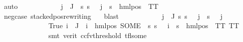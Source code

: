 \begin{isabellebody}
\ auto\isanewline
\ \ \ \ \ \ \ \ \ \ \isamarkupfalse%
\ {\isachardoublequoteopen}{\isasymforall}j\ {\isasymin}\ J{\isachardot}{\kern0pt}\ {\isasymexists}{\isasymalpha}{\isachardot}{\kern0pt}\ {\isacharparenleft}{\kern0pt}{\isasymforall}s{\isachardot}{\kern0pt}\ {\isacharparenleft}{\kern0pt}s\ {\isasymTurnstile}\ {\isasymPhi}\ j{\isacharparenright}{\kern0pt}\ {\isasymlongleftrightarrow}\ {\isacharparenleft}{\kern0pt}s\ {\isasymTurnstile}\ {\isacharparenleft}{\kern0pt}hml{\isacharunderscore}{\kern0pt}pos\ {\isasymalpha}\ TT{\isacharparenright}{\kern0pt}{\isacharparenright}{\kern0pt}{\isacharparenright}{\kern0pt}{\isachardoublequoteclose}\isanewline
\ \ \ \ \ \ \ \ \ \ \ \ \isamarkupfalse%
\ neg{\isacharunderscore}{\kern0pt}case\ stacked{\isacharunderscore}{\kern0pt}pos{\isacharunderscore}{\kern0pt}rewriting\ {\isachardoublequoteopen}{}{\isachardoublequoteclose}\ \isamarkupfalse%
\ blast\isanewline
\ \ \ \ \ \ \ \ \ \ \isamarkupfalse%
\ {\isachardoublequoteopen}{\isasymforall}j\ {\isasymin}\ J{\isachardot}{\kern0pt}\ {\isacharparenleft}{\kern0pt}{\isasymforall}s{\isachardot}{\kern0pt}\ {\isacharparenleft}{\kern0pt}s\ {\isasymTurnstile}\ {\isasymPhi}\ j{\isacharparenright}{\kern0pt}\ {\isasymlongleftrightarrow}\ {\isacharparenleft}{\kern0pt}s\ {\isasymTurnstile}\ {\isasymPsi}\ j{\isacharparenright}{\kern0pt}{\isacharparenright}{\kern0pt}{\isachardoublequoteclose}\isanewline
\ \ \ \ \ \ \ \ \ \ \ \ \isamarkupfalse%
\ True\ {\isacartoucheopen}{\isasymforall}i\ {\isasymin}\ J{\isachardot}{\kern0pt}\ {\isasymPsi}\ i\ {\isacharequal}{\kern0pt}\ {\isacharparenleft}{\kern0pt}hml{\isacharunderscore}{\kern0pt}pos\ {\isacharparenleft}{\kern0pt}SOME\ {\isasymalpha}{\isachardot}{\kern0pt}\ {\isacharparenleft}{\kern0pt}{\isasymforall}s{\isachardot}{\kern0pt}\ {\isacharparenleft}{\kern0pt}s\ {\isasymTurnstile}\ {\isasymPhi}\ i{\isacharparenright}{\kern0pt}\ {\isasymlongleftrightarrow}\ {\isacharparenleft}{\kern0pt}s\ {\isasymTurnstile}\ {\isacharparenleft}{\kern0pt}hml{\isacharunderscore}{\kern0pt}pos\ {\isasymalpha}\ TT{\isacharparenright}{\kern0pt}{\isacharparenright}{\kern0pt}{\isacharparenright}{\kern0pt}{\isacharparenright}{\kern0pt}\ TT{\isacharparenright}{\kern0pt}{\isacartoucheclose}\isanewline
\ \ \ \ \ \ \ \ \ \ \ \ \isamarkupfalse%
\ {\isacharparenleft}{\kern0pt}smt\ {\isacharparenleft}{\kern0pt}verit{\isacharcomma}{\kern0pt}\ ccfv{\isacharunderscore}{\kern0pt}threshold{\isacharparenright}{\kern0pt}\ tfl{\isacharunderscore}{\kern0pt}some{\isacharparenright}{\kern0pt}\isanewline

\end{isabellebody}
